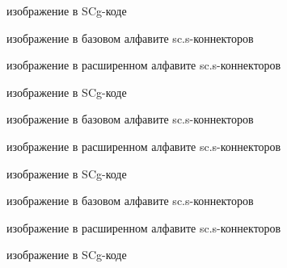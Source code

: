 \begin{scnsubstruct}
\begin{scnrelfromlist}{изображение в SCg-коде}
{}
\end{scnrelfromlist}
\begin{scnrelfromlist}{изображение в базовом алфавите sc.s-коннекторов}
\scnitem{\scnfileclass{$\sim>$}
}
\scnitem{\scnfileclass{$<\sim$}
}
\end{scnrelfromlist}
\begin{scnrelfromlist}{изображение в расширенном алфавите sc.s-коннекторов}
\scnitem{\scnfileclass{$\sim\ni$}
}
\scnitem{\scnfileclass{ $\in\sim$}
}
\end{scnrelfromlist}
\begin{scnrelfromlist}{изображение в SCg-коде}
\end{scnrelfromlist}
\begin{scnrelfromlist}{изображение в базовом алфавите sc.s-коннекторов}
\scnitem{\scnfileclass{$\sim$ |>}
}
\scnitem{\scnfileclass{<| $\sim$}
}
\end{scnrelfromlist}
\begin{scnrelfromlist}{изображение в расширенном алфавите sc.s-коннекторов}
\scnitem{\scnfileclass{$\sim \not\ni$}
}
\scnitem{\scnfileclass{ $\notin \sim$}
}
\end{scnrelfromlist}
\begin{scnrelfromlist}{изображение в SCg-коде}
\end{scnrelfromlist}
\begin{scnrelfromlist}{изображение в базовом алфавите sc.s-коннекторов}
\scnitem{\scnfileclass{$\sim$ />}
}
\scnitem{\scnfileclass{</ $\sim$}
}
\end{scnrelfromlist}
\begin{scnrelfromlist}{изображение в расширенном алфавите sc.s-коннекторов}
\scnitem{\scnfileclass{$\sim/\ni$}
}
\scnitem{\scnfileclass{ $\in/\sim$}
}
\end{scnrelfromlist}
\begin{scnrelfromlist}{изображение в SCg-коде}
\end{scnrelfromlist}
\end{scnsubstruct}
